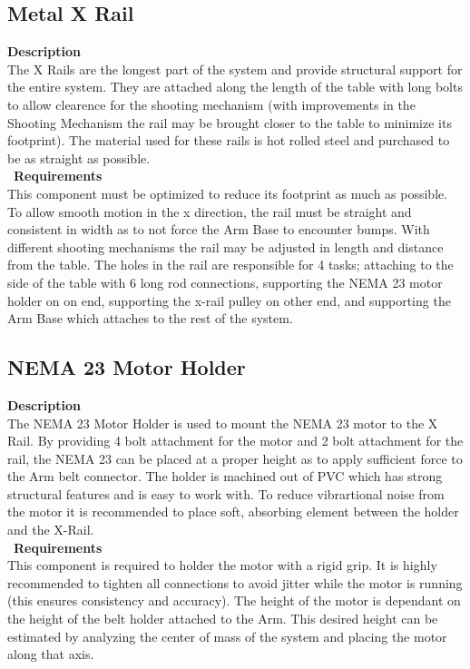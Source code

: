 \documentclass[titlepage]{article}
\begin{document}
\subsection{Metal X Rail}
\textbf{Description}\\
The X Rails are the longest part of the system and provide structural support for the entire system. They are attached along the length of the table with long bolts to allow clearence for the shooting mechanism (with improvements in the Shooting Mechanism the rail may be brought closer to the table to minimize its footprint). The material used for these rails is hot rolled steel and purchased to be as straight as possible.\\\
\textbf{Requirements}\\
This component must be optimized to reduce its footprint as much as possible. To allow smooth motion in the x direction, the rail must be straight and consistent in width as to not force the Arm Base to encounter bumps. With different shooting mechanisms the rail may be adjusted in length and distance from the table. The holes in the rail are responsible for 4 tasks; attaching to the side of the table with 6 long rod connections, supporting the NEMA 23 motor holder on on end, supporting the x-rail pulley on other end, and supporting the Arm Base which attaches to the rest of the system.


\subsection{NEMA 23 Motor Holder}
\textbf{Description}\\
The NEMA 23 Motor Holder is used to mount the NEMA 23 motor to the X Rail. By providing 4 bolt attachment for the motor and 2 bolt attachment for the rail, the NEMA 23 can be placed at a proper height as to apply sufficient force to the Arm belt connector. The holder is machined out of PVC which has strong structural features and is easy to work with. To reduce vibrartional noise from the motor it is recommended to place soft, absorbing element between the holder and the X-Rail.\\\
\textbf{Requirements}\\
This component is required to holder the motor with a rigid grip. It is highly recommended to tighten all connections to avoid jitter while the motor is running (this ensures consistency and accuracy). The height of the motor is dependant on the height of the belt holder attached to the Arm. This desired height can be estimated by analyzing the center of mass of the system and placing the motor along that axis. 
\end{document}
